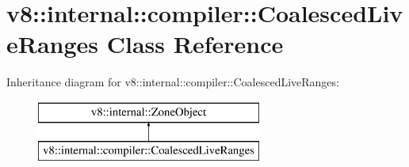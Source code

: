 \hypertarget{classv8_1_1internal_1_1compiler_1_1_coalesced_live_ranges}{}\section{v8\+:\+:internal\+:\+:compiler\+:\+:Coalesced\+Live\+Ranges Class Reference}
\label{classv8_1_1internal_1_1compiler_1_1_coalesced_live_ranges}
Inheritance diagram for v8\+:\+:internal\+:\+:compiler\+:\+:Coalesced\+Live\+Ranges\+:\begin{figure}[H]
\begin{center}
\leavevmode
\includegraphics[height=2.000000cm]{classv8_1_1internal_1_1compiler_1_1_coalesced_live_ranges}
\end{center}
\end{figure}
